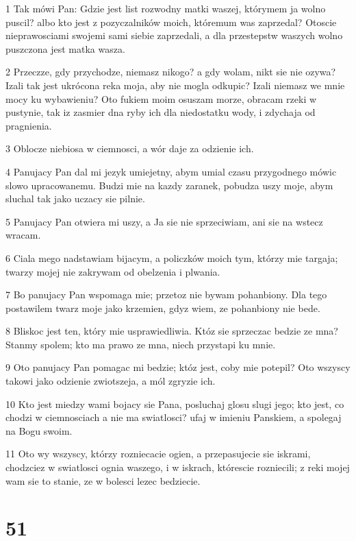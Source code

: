 \par 1 Tak mówi Pan: Gdzie jest list rozwodny matki waszej, którymem ja wolno puscil? albo kto jest z pozyczalników moich, któremum was zaprzedal? Otoscie nieprawosciami swojemi sami siebie zaprzedali, a dla przestepstw waszych wolno puszczona jest matka wasza.
\par 2 Przeczze, gdy przychodze, niemasz nikogo? a gdy wolam, nikt sie nie ozywa? Izali tak jest ukrócona reka moja, aby nie mogla odkupic? Izali niemasz we mnie mocy ku wybawieniu? Oto fukiem moim osuszam morze, obracam rzeki w pustynie, tak iz zasmier dna ryby ich dla niedostatku wody, i zdychaja od pragnienia.
\par 3 Oblocze niebiosa w ciemnosci, a wór daje za odzienie ich.
\par 4 Panujacy Pan dal mi jezyk umiejetny, abym umial czasu przygodnego mówic slowo upracowanemu. Budzi mie na kazdy zaranek, pobudza uszy moje, abym sluchal tak jako uczacy sie pilnie.
\par 5 Panujacy Pan otwiera mi uszy, a Ja sie nie sprzeciwiam, ani sie na wstecz wracam.
\par 6 Ciala mego nadstawiam bijacym, a policzków moich tym, którzy mie targaja; twarzy mojej nie zakrywam od obelzenia i plwania.
\par 7 Bo panujacy Pan wspomaga mie; przetoz nie bywam pohanbiony. Dla tego postawilem twarz moje jako krzemien, gdyz wiem, ze pohanbiony nie bede.
\par 8 Bliskoc jest ten, który mie usprawiedliwia. Któz sie sprzeczac bedzie ze mna? Stanmy spolem; kto ma prawo ze mna, niech przystapi ku mnie.
\par 9 Oto panujacy Pan pomagac mi bedzie; któz jest, coby mie potepil? Oto wszyscy takowi jako odzienie zwiotszeja, a mól zgryzie ich.
\par 10 Kto jest miedzy wami bojacy sie Pana, posluchaj glosu slugi jego; kto jest, co chodzi w ciemnosciach a nie ma swiatlosci? ufaj w imieniu Panskiem, a spolegaj na Bogu swoim.
\par 11 Oto wy wszyscy, którzy rozniecacie ogien, a przepasujecie sie iskrami, chodzciez w swiatlosci ognia waszego, i w iskrach, którescie rozniecili; z reki mojej wam sie to stanie, ze w bolesci lezec bedziecie.

\chapter{51}

